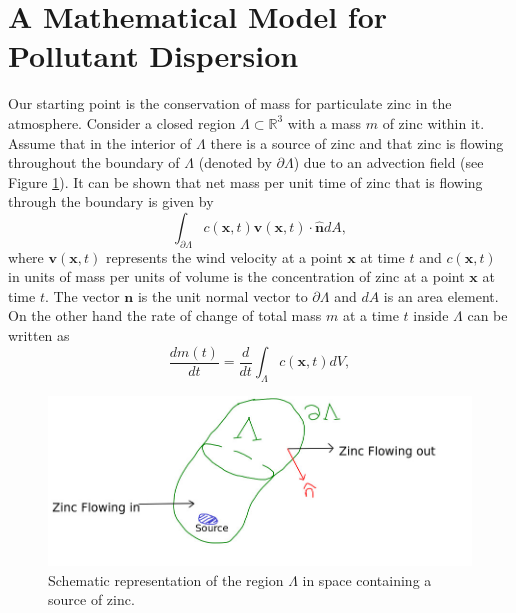 \documentclass{sfuthesis}
\newcommand{\x}{\textbf{x}}
\newcommand{\vv}{\textbf{v}}
\begin{document}
\section{A Mathematical Model for Pollutant Dispersion}
Our starting point  is the conservation of mass for
particulate zinc in the atmosphere. Consider a closed region  $\Lambda\subset\mathbb{R}^{3}$ with a mass $m$ 
of zinc within it. 
Assume
that in the interior of $\Lambda$ there is  a source of  zinc and that zinc is flowing throughout 
the boundary  of $\Lambda$  (denoted by $\partial\Lambda$) due to an advection field (see Figure \ref{figControlVolume}).
It can be shown that net mass
per unit time of zinc that is flowing through the boundary is given by
\cite{seinfeld1998atmospheric}
\begin{equation*}
\int_{\partial\Lambda}c(\x,t)\vv(\x,t)\cdot\hat{\textbf{n}}dA,
\end{equation*}
where  $\vv(\x,t)$ represents the wind velocity at a point $\x$ at time $t$ and $c(\x,t)$ in units of mass per units of volume is the concentration of zinc at a point $\x$
at time $t$. The vector $\textbf{n}$ is the unit normal vector to $\partial\Lambda$ and $dA$ is an area element.
 On the other hand
the rate of change of total mass $m$ at a time $t$ inside $\Lambda$  can be written as
\begin{equation*}
\frac{dm(t)}{dt}=\frac{d}{dt}\int_{\Lambda}c(\x,t)dV,
\end{equation*}
\begin{figure}[H]
\centering
\includegraphics[scale=0.5]{./FigChap4/controlVolume}
\caption{Schematic representation of the region $\Lambda$ in space containing a source of zinc.}
\label{figControlVolume}
\end{figure}
\end{document}

